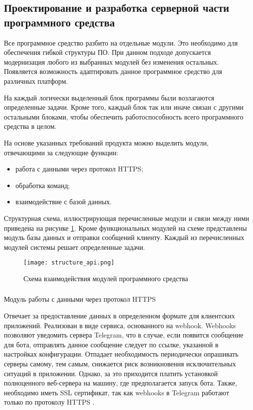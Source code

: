 \subsection{Проектирование и разработка серверной части программного средства}
\label{sec:design:server}

Все программное средство разбито на отдельные модули. Это
необходимо для обеспечения гибкой структуры ПО. При данном подходе
допускается модернизация любого из выбранных модулей без изменения
остальных. Появляется возможность адаптировать данное программное
средство для различных платформ.

На каждый логически выделенный блок программы были возлагаются
определенные задачи. Кроме того, каждый блок так или иначе связан с
другими остальными блоками, чтобы обеспечить работоспособность всего
программного средства в целом.

На основе указанных требований продукта можно выделить модули, отвечающими за следующие функции:

\begin{itemize}
	\item работа с данными через протокол HTTPS;
	\item обработка команд;
	\item взаимодействие с базой данных.
\end{itemize}

Структурная схема, иллюстрирующая перечисленные модули и связи
между ними приведена на рисунке \ref{fig:design:architecture:structure_api}. Кроме функциональных модулей на
схеме представлены модуль базы данных и отправки сообщений клиенту.
Каждый из перечисленных модулей системы решает определенные задачи.

\begin{figure}[!h]
\centering
	\texttt{[image: structure\_api.png]}
	\caption{Схема взаимодействия модулей программного средства}
	\label{fig:design:architecture:structure_api}
\end{figure}
\subsubsection{} Модуль работы с данными через протокол HTTPS
\label{sec:design:server:api}

Отвечает за предоставление данных в определенном формате для клиентских приложений. Реализован в виде сервиса, основанного на \linebreak webhook. Webhooks позволяют уведомить сервера Telegram, что в случае, если появится сообщение для бота, отправлять данное сообщение следует по ссылке, указанной в настройках конфигурации. Отпадает необходимость периодически опрашивать серверы самому, тем самым, снижается риск возникновения исключительных ситуаций в приложении. Однако, за это приходится платить установкой полноценного веб-сервера на машину, где предполагается запуск бота. Также, необходимо иметь SSL сертификат, так как webhooks в Telegram работают только по протоколу HTTPS \cite{web_protocols}.

